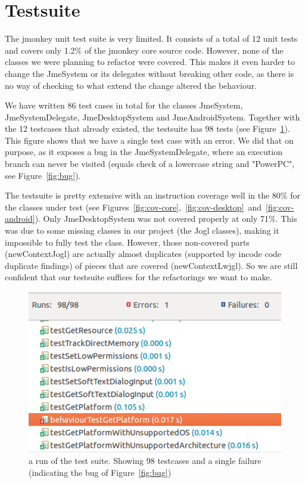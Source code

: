 \documentclass[a4paper, 10pt]{article}
\begin{document}
\section{Testsuite}
\label{sec:testsuite}
The jmonkey unit test suite is very limited.
It consists of a total of 12 unit tests and covers only 1.2\% of the jmonkey core source code.
However, none of the classes we were planning to refactor were covered.
This makes it even harder to change the JmeSystem or its delegates without breaking other code,
as there is no way of checking to what extend the change altered the behaviour.

We have written 86 test cases in total for the classes JmeSystem, JmeSystemDelegate, JmeDesktopSystem and JmeAndroidSystem.
Together with the 12 testcases that already existed, the testsuite has 98 tests (see Figure~\ref{fig:num-tests}).
This figure shows that we have a single test case with an error.
We did that on purpose, as it exposes a bug in the JmeSystemDelegate, 
where an execution branch can never be visited (equals check of a lowercase string and "PowerPC", see Figure~\ref{fig:bug}).

The testsuite is pretty extensive with an instruction coverage well in the 80\% for the classes under test (see Figures~\ref{fig:cov-core},~\ref{fig:cov-desktop}~and~\ref{fig:cov-android}).
Only JmeDesktopSystem was not covered properly at only 71\%. 
This was due to some missing classes in our project (the Jogl classes),
making it impossible to fully test the class. 
However, those non-covered parts (newContextJogl) are actually almost duplicates (supported by incode code duplicate findings) of pieces that are covered (newContextLwjgl).
So we are still confident that our testsuite suffices for the refactorings we want to make.


\begin{figure}[!hb]
\includegraphics[width=\textwidth]{figures/86-new-tests.png}
\caption{a run of the test suite. Showing 98 testcases and a single failure (indicating the bug of Figure~\ref{fig:bug})}
\label{fig:num-tests}
\end{figure}
\end{document}
